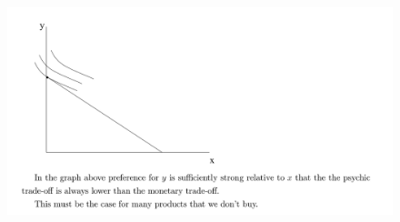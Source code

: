 \documentclass[table]{beamer}
\begin{document}
\begin{frame}

\begin{figure}

{\centering \includegraphics[width=1\linewidth]{picsfigs/goodwedontbuy} 

}

\end{figure}

\end{frame}
\end{document}
